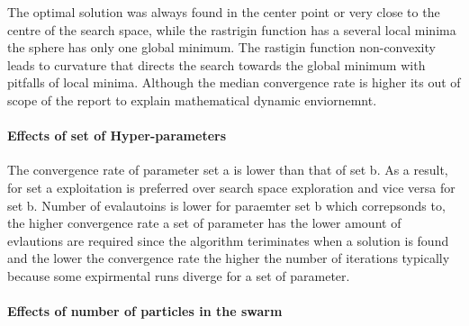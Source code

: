 \documentclass[
]{article}
\begin{document}
The optimal solution was always found in the center point or very close
to the centre of the search space, while the rastrigin function has a
several local minima the sphere has only one global minimum. The
rastigin function non-convexity leads to curvature that directs the
search towards the global minimum with pitfalls of local minima.
Although the median convergence rate is higher its out of scope of the
report to explain mathematical dynamic enviornemnt.

\hypertarget{effects-of-set-of-hyper-parameters}{%
\paragraph{Effects of set of
Hyper-parameters}\label{effects-of-set-of-hyper-parameters}}

\begin{table}[H]
 \centering
 \end{table}

The convergence rate of parameter set a is lower than that of set b. As
a result, for set a exploitation is preferred over search space
exploration and vice versa for set b. Number of evalautoins is lower for
paraemter set b which correpsonds to, the higher convergence rate a set
of parameter has the lower amount of evlautions are required since the
algorithm teriminates when a solution is found and the lower the
convergence rate the higher the number of iterations typically because
some expirmental runs diverge for a set of parameter.

\hypertarget{effects-of-number-of-particles-in-the-swarm}{%
\paragraph{Effects of number of particles in the
swarm}\label{effects-of-number-of-particles-in-the-swarm}}

\begin{table}[H]
\centering
{}
\end{table}
\end{document}
